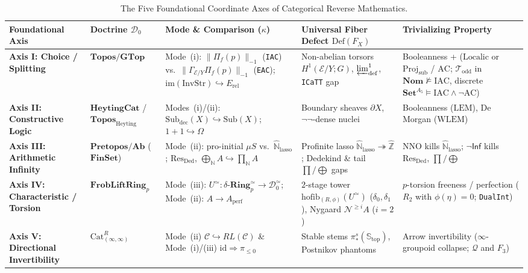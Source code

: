 \documentclass[10pt,twoside,openright]{book}
\theoremstyle{crmplain}
\theoremstyle{crmdef}
\theoremstyle{crmremark}
\begin{document}
\begin{table}[htbp]
\centering
\scriptsize
\setlength{\tabcolsep}{2.4pt}
\renewcommand{\arraystretch}{1.10}
\begin{tabularx}{\textwidth}{@{}P{0.14\textwidth}P{0.18\textwidth}YP{0.22\textwidth}P{0.20\textwidth}@{}}
\toprule
\textbf{Foundational Axis} & \textbf{Doctrine $\mathcal{D}_0$} & \textbf{Mode \& Comparison ($\kappa$)} & \textbf{Universal Fiber Defect $\mathrm{Def}(F_X)$} & \textbf{Trivializing Property} \\
\midrule
\textbf{Axis I: Choice / Splitting} & $\mathbf{Topos} / \mathbf{GTop}$ & Mode~(i): $\|\Pi_f(p)\|_{-1}$ (\texttt{IAC}) vs.\ $\|\Gamma_{\mathcal{E}/Y}\Pi_f(p)\|_{-1}$ (\texttt{EAC}); $\mathrm{im}(\mathrm{InvStr}) \hookrightarrow E_{\mathrm{rel}}$ & Non-abelian torsors $H^1(\mathcal{E}/Y; G)$, $\varprojlim^1_{\mathrm{def}}$, \texttt{ICaTT} gap & Booleanness + ($\mathrm{Localic}$ or $\mathrm{Proj}_{\mathrm{sub}}$ / $\mathrm{AC}$; $\mathcal{T}_{\mathrm{odd}}$ in $\mathbf{Nom} \not\models \mathrm{IAC}$, discrete $\mathbf{Set}^{A_5} \models \mathrm{IAC}\wedge\neg\mathrm{AC}$) \\
\textbf{Axis II: Constructive Logic} & $\mathbf{HeytingCat}$ / $\mathbf{Topos}_{\mathrm{Heyting}}$ & Modes~(i)/(ii): $\mathrm{Sub}_{\mathrm{dec}}(X) \hookrightarrow \mathrm{Sub}(X)$; $1+1 \hookrightarrow \Omega$ & Boundary sheaves $\partial X$, $\neg\neg$-dense nuclei & Booleanness ($\mathrm{LEM}$), De Morgan ($\mathrm{WLEM}$) \\
\textbf{Axis III: Arithmetic Infinity} & $\mathbf{Pretopos} / \mathbf{Ab}$ ($\mathbf{FinSet}$) & Mode~(ii): pro-initial $\mu S$ vs.\ $\widehat{\mathbb{N}}_{\mathrm{lasso}}$; $\mathrm{Res}_{\mathrm{Ded}}$, $\bigoplus_{\mathbb{N}} A \hookrightarrow \prod_{\mathbb{N}} A$ & Profinite lasso $\widehat{\mathbb{N}}_{\mathrm{lasso}} \twoheadrightarrow \widehat{\mathbb{Z}}$; Dedekind \& tail $\prod/\bigoplus$ gaps & $\mathrm{NNO}$ kills $\widehat{\mathbb{N}}_{\mathrm{lasso}}$; $\neg\mathsf{Inf}$ kills $\mathrm{Res}_{\mathrm{Ded}}$, $\prod/\bigoplus$ \\
\textbf{Axis IV: Characteristic / Torsion} & $\mathbf{FrobLift}\allowbreak\mathbf{Ring}_p$ & Mode~(iii): $U^{\simeq} : \delta\text{-}\mathbf{Ring}_p^{\simeq} \to \mathcal{D}_0^{\simeq}$; Mode~(ii): $A \to A_{\mathrm{perf}}$ & $2$-stage tower $\mathrm{hofib}_{(R,\phi)}(U^{\simeq})$ ($\delta_0, \delta_1$), Nygaard $\mathcal{N}^{\ge i}A$ ($i=2$) & $p$-torsion freeness / perfection ($R_2$ with $\phi(\eta)=0$; \texttt{DualInt}) \\
\textbf{Axis V: Directional Invertibility} & $\mathrm{Cat}^R_{(\infty,\infty)}$ & Mode~(ii) $\mathcal{C} \hookrightarrow RL(\mathcal{C})$ \& Mode~(i)/(iii) $\mathrm{id} \Rightarrow \pi_{\le 0}$ & Stable stems $\pi_*^s(\mathbb{S}_{\mathrm{top}})$, Postnikov phantoms & Arrow invertibility ($\infty$-groupoid collapse; $\mathcal{Q}$ and $F_3$) \\
\bottomrule
\end{tabularx}
\caption{The Five Foundational Coordinate Axes of Categorical Reverse Mathematics.}
\label{tab:five-axis-master}
\end{table}
\end{document}
